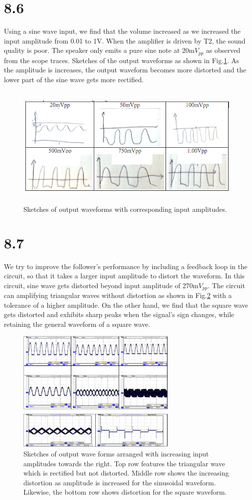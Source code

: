 \documentclass[authoryear, 12pt,5p, times]{elsarticle}
\begin{document}
 \section*{8.6}
 Using a sine wave input, we find that the volume increased as we increased the input amplitude from 0.01 to 1V. When the amplifier is driven by T2, the sound quality is poor. The speaker only emits a pure sine note at 20m$V_{pp}$ as observed from the scope traces. Sketches of the output waveforms as shown in Fig.\ref{lotsofwaves}.  As the amplitude is increases, the output waveform becomes more distorted and the lower part of the sine wave gets more rectified. 
  \begin{figure}[h!]
  \includegraphics[width=\textwidth,height=6cm]{figure/waveformlots.png}
\caption{Sketches of output waveforms with corresponding input amplitudes.}
\label{lotsofwaves}
\end{figure}
 \section*{8.7}
 We try to improve the follower's performance by including a feedback loop in the circuit, so that it takes a larger input amplitude to distort the waveform. In this circuit, sine wave gets distorted beyond input amplitude of 270m$V_{pp}$. The circuit can amplifying triangular waves without distortion as shown in Fig.\ref{8_7_scope} with a tolerance of a higher amplitude. On the other hand, we find that the square wave gets distorted and exhibits sharp peaks when the signal's sign changes, while retaining the general waveform of a square wave.
   \begin{figure}[h!]
  \includegraphics[width=\textwidth,height=6cm]{figure/8_7_scope.png}
\caption{Sketches of output wave forms arranged with increasing input amplitudes towards the right. Top row features the triangular wave which is rectified but not distorted. Middle row shows the increasing distortion as amplitude is increased for the sinusoidal waveform. Likewise, the bottom row shows distortion for the square waveform.}
\label{8_7_scope}
\end{figure}
\end{document}
